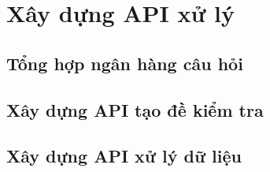 \chapter{Xây dựng API xử lý}

\section{Tổng hợp ngân hàng câu hỏi}

\section{Xây dựng API tạo đề kiểm tra}

\section{Xây dựng API xử lý dữ liệu}
